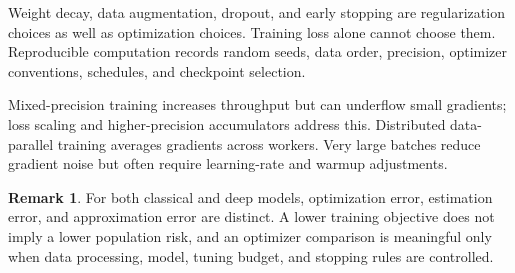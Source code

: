 \documentclass[12pt,oneside]{book}
\numberwithin{equation}{section}
\theoremstyle{definition}
\newtheorem{remark}{Remark}[section]
\theoremstyle{plain}
\theoremstyle{remark}
\begin{document}
Weight decay, data augmentation, dropout, and early stopping are
regularization choices as well as optimization choices. Training loss alone
cannot choose them. Reproducible computation records random seeds, data order,
precision, optimizer conventions, schedules, and checkpoint selection.

Mixed-precision training increases throughput but can underflow small
gradients; loss scaling and higher-precision accumulators address this.
Distributed data-parallel training averages gradients across workers. Very
large batches reduce gradient noise but often require learning-rate and
warmup adjustments.

\begin{remark}
For both classical and deep models, optimization error, estimation error, and
approximation error are distinct. A lower training objective does not imply a
lower population risk, and an optimizer comparison is meaningful only when
data processing, model, tuning budget, and stopping rules are controlled.
\end{remark}
\end{document}
